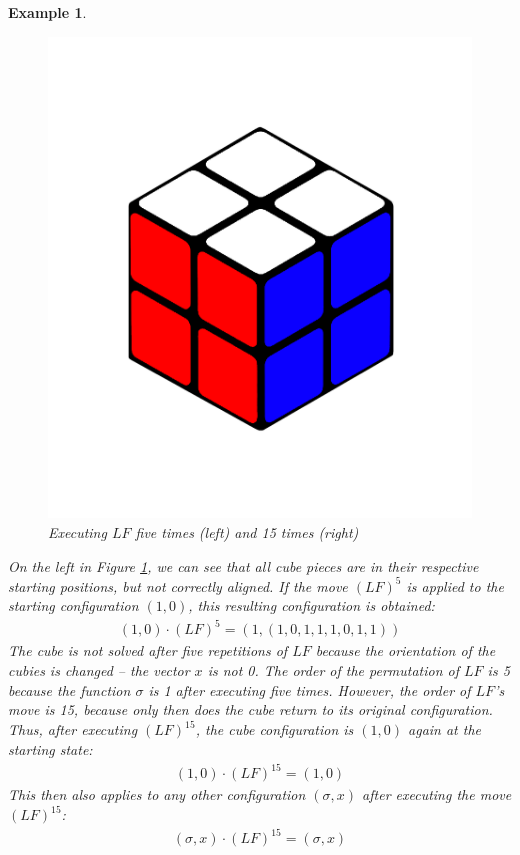 \documentclass[12pt,a4paper]{article}
\theoremstyle{custom}
\newtheorem*{example}{Example}
\begin{document}
\begin{example}
\begin{figure}[H]
\includegraphics[scale=0.15]{2x2solved.png}
\caption{Executing $LF$ five times (left) and 15 times (right)}
\label{Figure_LF_5_15}
\end{figure}

On the left in Figure \ref{Figure_LF_5_15}, we can see that all cube pieces are in their respective starting positions, but not correctly aligned. If the move $(LF)^5$ is applied to the starting configuration $(1,0)$, this resulting configuration is obtained:
\begin{align*}
(1,0) \cdot (LF)^5 = (1, (1,0,1,1,1,0,1,1))
\end{align*}
The cube is not solved after five repetitions of $LF$ because the orientation of the cubies is changed -- the vector $x$ is not 0. The order of the permutation of $LF$ is 5 because the function $\sigma$ is 1 after executing five times. However, the order of $LF$'s move is 15, because only then does the cube return to its original configuration. Thus, after executing $(LF)^{15}$, the cube configuration is $(1,0)$ again at the starting state:
\begin{align*}
(1,0) \cdot (LF)^{15} = (1,0)
\end{align*}
This then also applies to any other configuration $(\sigma, x)$ after executing the move $(LF)^{15}$:
\begin{align*}
(\sigma, x) \cdot (LF)^{15} = (\sigma, x)
\end{align*}
\end{example}
\end{document}
